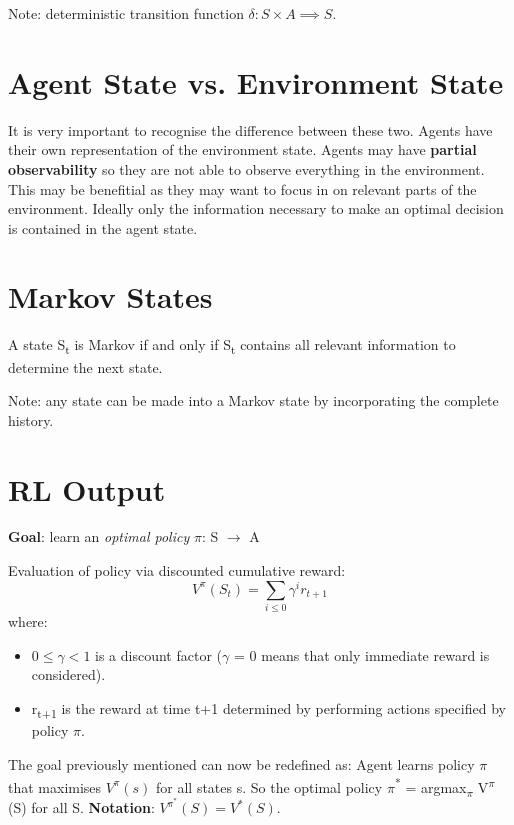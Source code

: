\documentclass[11pt]{article}
\begin{document}
Note: deterministic transition function \(\delta: S \times A \implies S\).

\section{Agent State vs. Environment State}
\label{sec:org4beb083}
It is very important to recognise the difference between these two.
Agents have their own representation of the environment state.
Agents may have \textbf{partial observability} so they are not able to observe everything in the environment.
This may be benefitial as they may want to focus in on relevant parts of the environment.
Ideally only the information necessary to make an optimal decision is contained in the agent state.

\section{Markov States}
\label{sec:org9a80b1c}
A state S\textsubscript{t} is Markov if and only if S\textsubscript{t} contains all relevant information to determine the next state.

Note: any state can be made into a Markov state by incorporating the complete history.

\section{RL Output}
\label{sec:org48fb5be}
\textbf{Goal}: learn an \emph{optimal policy} \(\pi\): S \(\rightarrow\) A

Evaluation of policy via discounted cumulative reward:
\begin{equation}
V^{\pi}(S_t) = \sum\limits_{i \le 0} \gamma^i r_{t+1}
\end{equation}
where:
\begin{itemize}
\item \(0\le \gamma < 1\) is a discount factor (\(\gamma\) = 0 means that only immediate reward is considered).
\item r\textsubscript{t+1} is the reward at time t+1 determined by performing actions specified by policy \(\pi\).
\end{itemize}
The goal previously mentioned can now be redefined as: Agent learns policy \(\pi\) that maximises \(V^{\pi}(s)\) for all states s.
So the optimal policy \(\pi\)\textsuperscript{*} = argmax\textsubscript{\(\pi\)} V\textsuperscript{\(\pi\)}(S) for all S.
\textbf{Notation}: \(V^{\pi^*}(S) = V^*(S)\).
\end{document}
